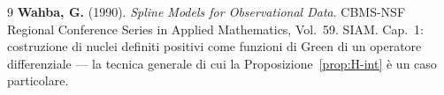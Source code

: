\documentclass[11pt,a4paper]{article}
\theoremstyle{plain}
\theoremstyle{definition}
\theoremstyle{remark}
\begin{document}
\begin{thebibliography}{9}
  \textbf{Wahba, G.} (1990).
  \textit{Spline Models for Observational Data}.
  CBMS-NSF Regional Conference Series in Applied Mathematics, Vol.~59. SIAM.
  Cap.~1: costruzione di nuclei definiti positivi come funzioni di Green di un operatore
  differenziale --- la tecnica generale di cui la Proposizione~\ref{prop:H-int} \`e un caso
  particolare.

\end{thebibliography}
\end{document}
